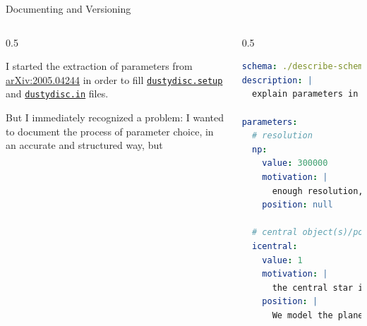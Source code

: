 \documentclass[9pt]{beamer}
\begin{document}
\begin{frame}[fragile]{Documenting and Versioning}
    \begin{columns}
        \begin{column}{0.5\textwidth}
            \vspace*{10pt}

            I started the extraction of parameters from
            \href{https://arxiv.org/abs/2005.04244}{arXiv:2005.04244} in order
            to fill
            \href{https://github.com/AleCandido/fluiddynamics_exam/blob/main/ds-tau/dustydisc.setup}{\texttt{dustydisc.setup}}
            and
            \href{https://github.com/AleCandido/fluiddynamics_exam/blob/main/ds-tau/dustydisc.in}{\texttt{dustydisc.in}}
            files.
            \vspace*{5pt}

            But I immediately recognized a problem: I wanted to document the
            process of parameter choice, in an accurate and structured way, but  
        \end{column}
        \begin{column}{0.5\textwidth}
            \begin{lstlisting}[style=mystyle, language=yaml, breaklines=true]
schema: ./describe-schema.yaml
description: |
  explain parameters in 'dustydisc.setup'

parameters:
  # resolution
  np:
    value: 300000
    motivation: |
      enough resolution, without pushing to much performances
    position: null

  # central object(s)/potential
  icentral:
    value: 1
    motivation: |
      the central star is modeled as a sink particle
    position: |
      We model the planet and the central star as sink particle
\end{lstlisting}
        \end{column}
    \end{columns}
\end{frame}
\end{document}
